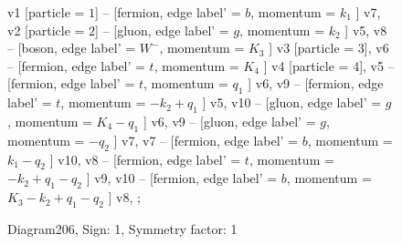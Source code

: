\documentclass{revtex4}
\begin{document}
\begin{figure}[!htb]
\begin{center}
{    %
v1 [particle = \(1\)] -- [fermion, edge label' = \(b\), momentum = \(k_{1}\) ] v7, 
v2 [particle = \(2\)] -- [gluon, edge label' = \(g\), momentum = \(k_{2}\) ] v5, 
v8 -- [boson, edge label' = \(W^{-}\), momentum = \(K_{3}\) ] v3 [particle = \(3\)], 
v6 -- [fermion, edge label' = \(t\), momentum = \(K_{4}\) ] v4 [particle = \(4\)], 
v5 -- [fermion, edge label' = \(t\), momentum = \(q_{1}\) ] v6, 
v9 -- [fermion, edge label' = \(t\), momentum = \(-k_{2} + q_{1}\) ] v5, 
v10 -- [gluon, edge label' = \(g\), momentum = \(K_{4} - q_{1}\) ] v6, 
v9 -- [gluon, edge label' = \(g\), momentum = \(-q_{2}\) ] v7, 
v7 -- [fermion, edge label' = \(b\), momentum = \(k_{1} - q_{2}\) ] v10, 
v8 -- [fermion, edge label' = \(t\), momentum = \(-k_{2} + q_{1} - q_{2}\) ] v9, 
v10 -- [fermion, edge label' = \(b\), momentum = \(K_{3} - k_{2} + q_{1} - q_{2}\) ] v8, 
};
\end{center}
\caption{Diagram206, Sign: 1, Symmetry factor: 1}
\end{figure}
\newpage
\end{document}
